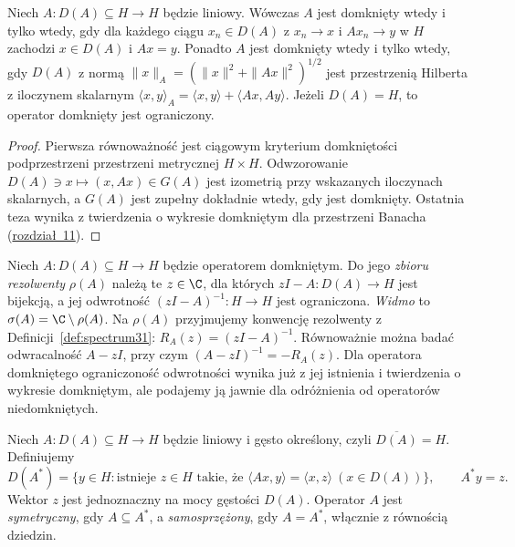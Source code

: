 \begin{stwierdzenie}
\label{prop:graph33}
Niech $A:D(A)\subseteq H\to H$ będzie liniowy.
Wówczas $A$ jest domknięty wtedy i tylko wtedy, gdy dla każdego
ciągu $x_n\in D(A)$ z $x_n\to x$ i $Ax_n\to y$ w $H$ zachodzi
$x\in D(A)$ i $Ax=y$. Ponadto $A$ jest domknięty wtedy i tylko wtedy,
gdy $D(A)$ z normą $\|x\|_A=(\|x\|^2+\|Ax\|^2)^{1/2}$ jest
przestrzenią Hilberta z iloczynem skalarnym
$\langle x,y\rangle_A=\langle x,y\rangle+\langle Ax,Ay\rangle$.
Jeżeli $D(A)=H$, to operator domknięty jest ograniczony.
\end{stwierdzenie}
\begin{proof}
Pierwsza równoważność jest ciągowym kryterium domkniętości
podprzestrzeni przestrzeni metrycznej $H\times H$.
Odwzorowanie $D(A)\ni x\mapsto(x,Ax)\in G(A)$ jest izometrią
przy wskazanych iloczynach skalarnych, a $G(A)$ jest zupełny dokładnie
wtedy, gdy jest domknięty. Ostatnia teza wynika z twierdzenia
o wykresie domkniętym dla przestrzeni Banacha
(\hyperref[sec:frechet-open-graph]{rozdział~11}).
\end{proof}

\begin{definicja}
Niech $A:D(A)\subseteq H\to H$ będzie operatorem domkniętym.
Do jego \emph{zbioru rezolwenty} $\rho(A)$ należą te $z\in\C$,
dla których $zI-A:D(A)\to H$ jest bijekcją, a jej
odwrotność $(zI-A)^{-1}:H\to H$ jest ograniczona.
\emph{Widmo} to $\sigma(A)=\C\setminus\rho(A)$.
Na $\rho(A)$ przyjmujemy konwencję rezolwenty z
Definicji~\ref{def:spectrum31}:
$R_A(z)=(zI-A)^{-1}$. Równoważnie można badać
odwracalność $A-zI$, przy czym $(A-zI)^{-1}=-R_A(z)$.
Dla operatora domkniętego ograniczoność odwrotności wynika już
z jej istnienia i twierdzenia o wykresie domkniętym,
ale podajemy ją jawnie dla odróżnienia od operatorów niedomkniętych.
\end{definicja}

\begin{definicja}
\label{def:adjoint33}
Niech $A:D(A)\subseteq H\to H$ będzie liniowy i gęsto określony,
czyli $\overline{D(A)}=H$. Definiujemy
\[
 D(A^*)=\{y\in H:\text{istnieje }z\in H\text{ takie, że }
 \langle Ax,y\rangle=\langle x,z\rangle\ (x\in D(A))\},
 \qquad A^*y=z.
\]
Wektor $z$ jest jednoznaczny na mocy gęstości $D(A)$.
Operator $A$ jest \emph{symetryczny}, gdy $A\subseteq A^*$,
a \emph{samosprzężony}, gdy $A=A^*$, włącznie z równością dziedzin.
\end{definicja}

